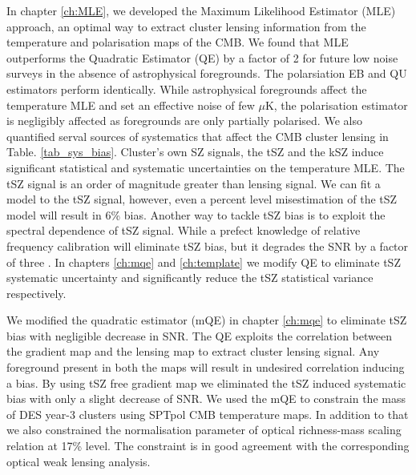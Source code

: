 In chapter \ref{ch:MLE}, we developed the Maximum Likelihood Estimator (MLE) approach, an optimal way to extract cluster lensing information from the temperature and polarisation maps of the CMB.	  
We found that MLE outperforms the Quadratic Estimator (QE) by a factor of 2 for future low noise surveys in the absence of astrophysical foregrounds. 
The polarsiation EB and QU estimators perform identically. 
While astrophysical foregrounds affect the temperature MLE and set an effective noise of few $\mu$K, the polarisation estimator is negligibly affected as foregrounds are only partially polarised.
We also quantified serval sources of systematics that affect the CMB cluster lensing in Table. \ref{tab_sys_bias}.
Cluster's own SZ signals, the tSZ and the kSZ induce significant statistical and systematic uncertainties on the temperature MLE. 
The tSZ signal is an order of magnitude greater than lensing signal. 
We can fit a model to the tSZ signal, however, even a percent level misestimation of the tSZ model will result in 6\% bias.
Another way to tackle tSZ bias is to exploit the spectral dependence of tSZ signal. 
While a prefect knowledge of relative frequency calibration will eliminate tSZ bias, but it degrades the SNR by a factor of three \citep{baxter15}.
 In chapters \ref{ch:mqe} and \ref{ch:template} we modify QE to eliminate tSZ systematic uncertainty and significantly reduce the tSZ statistical variance respectively.
   
We modified the quadratic estimator (mQE) in chapter \ref{ch:mqe} to eliminate tSZ bias with negligible decrease in SNR. 
The QE exploits the correlation between the gradient map and the lensing map to extract cluster lensing signal.
Any foreground present in both the maps will result in undesired correlation inducing a bias. 
By using tSZ free gradient map we eliminated the tSZ induced systematic bias with only a slight decrease of SNR. 
 We used the mQE to constrain the mass of DES year-3  clusters using SPTpol CMB temperature maps. 
 In addition to that we also constrained the normalisation parameter of optical richness-mass scaling relation at 17\% level. 
 The constraint is in good agreement with the corresponding optical weak lensing analysis.
 
